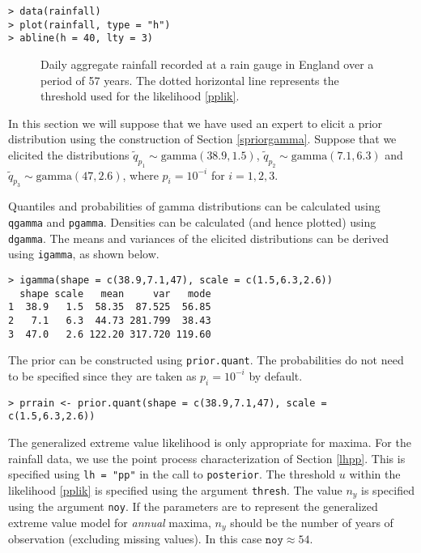 \documentclass[11pt,a4paper]{article}
\begin{document}
\begin{verbatim}
> data(rainfall)
> plot(rainfall, type = "h")
> abline(h = 40, lty = 3)
\end{verbatim}

\begin{figure}
\begin{center}
\vspace{-1.5cm}
\end{center}
\caption{Daily aggregate rainfall  recorded at a rain gauge in England over a period of 57 years. The dotted horizontal line represents the threshold used for the likelihood \eqref{pplik}.}
\label{raindata}
\end{figure}

In this section we will suppose that we have used an expert to elicit a prior distribution using the construction of Section \ref{spriorgamma}.
Suppose that we elicited the distributions $\tilde{q}_{p_1} \sim \text{gamma}(38.9,1.5)$, $\tilde{q}_{p_2} \sim \text{gamma}(7.1,6.3)$ and $\tilde{q}_{p_3} \sim \text{gamma}(47,2.6)$, where $p_i = 10^{-i}$ for $i=1,2,3$.

Quantiles and probabilities of gamma distributions can be calculated using \verb+qgamma+ and \verb+pgamma+.
Densities can be calculated (and hence plotted) using \verb+dgamma+.
The means and variances of the elicited distributions can be derived using \verb+igamma+, as shown below.

\begin{verbatim}
> igamma(shape = c(38.9,7.1,47), scale = c(1.5,6.3,2.6))
  shape scale   mean     var   mode
1  38.9   1.5  58.35  87.525  56.85
2   7.1   6.3  44.73 281.799  38.43
3  47.0   2.6 122.20 317.720 119.60
\end{verbatim}

The prior can be constructed using \verb+prior.quant+.
The probabilities do not need to be specified since they are taken as $p_i = 10^{-i}$ by default. 

\begin{verbatim}
> prrain <- prior.quant(shape = c(38.9,7.1,47), scale = c(1.5,6.3,2.6))
\end{verbatim}

The generalized extreme value likelihood is only appropriate for maxima.
For the rainfall data, we use the point process characterization of Section \ref{lhpp}.
This is specified using \verb+lh = "pp"+ in the call to \verb+posterior+.
The threshold $u$ within the likelihood \eqref{pplik} is specified using the argument \verb+thresh+.
The value $n_y$ is specified using the argument \verb+noy+.
If the parameters are to represent the generalized extreme value model for \emph{annual} maxima, $n_y$ should be the number of years of observation (excluding missing values).
In this case $\texttt{noy} \approx 54$. 
\end{document}
